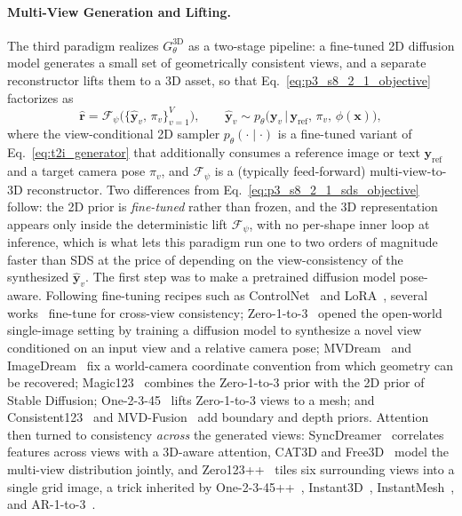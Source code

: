 \paragraph{Multi-View Generation and Lifting.}
\label{para:p3_s8_2_1_mv}
The third paradigm realizes $G_\theta^{\text{3D}}$ as a two-stage pipeline: a fine-tuned 2D diffusion model generates a small set of geometrically consistent views, and a separate reconstructor lifts them to a 3D asset, so that Eq.~\eqref{eq:p3_s8_2_1_objective} factorizes as
\begin{equation}
\hat{\mathbf{r}}
=
\mathcal{F}_\psi\Big(\big\{\hat{\mathbf{y}}_v,\,\pi_v\big\}_{v=1}^V\Big),
\qquad
\hat{\mathbf{y}}_v \sim p_\theta\big(\mathbf{y}_v \,\big|\, \mathbf{y}_{\text{ref}},\,\pi_v,\,\phi(\mathbf{x})\big),
\label{eq:p3_s8_2_1_mv_objective}
\end{equation}
where the view-conditional 2D sampler $p_\theta(\cdot\mid\cdot)$ is a fine-tuned variant of Eq.~\eqref{eq:t2i_generator} that additionally consumes a reference image or text $\mathbf{y}_{\text{ref}}$ and a target camera pose $\pi_v$, and $\mathcal{F}_\psi$ is a (typically feed-forward) multi-view-to-3D reconstructor.
Two differences from Eq.~\eqref{eq:p3_s8_2_1_sds_objective} follow: the 2D prior is \emph{fine-tuned} rather than frozen, and the 3D representation appears only inside the deterministic lift $\mathcal{F}_\psi$, with no per-shape inner loop at inference, which is what lets this paradigm run one to two orders of magnitude faster than SDS at the price of depending on the view-consistency of the synthesized $\hat{\mathbf{y}}_v$.
The first step was to make a pretrained diffusion model pose-aware. Following fine-tuning recipes such as ControlNet~\cite{zhang2023adding} and LoRA~\cite{hu2022lora}, several works~\cite{raj2023dreambooth3d, seo2023let3DFuse} fine-tune for cross-view consistency; Zero-1-to-3~\cite{liu2023zero} opened the open-world single-image setting by training a diffusion model to synthesize a novel view conditioned on an input view and a relative camera pose; MVDream~\cite{shi2023mvdream} and ImageDream~\cite{wang2023imagedream} fix a world-camera coordinate convention from which geometry can be recovered; Magic123~\cite{qian2023magic123} combines the Zero-1-to-3 prior with the 2D prior of Stable Diffusion; One-2-3-45~\cite{liu2023one2345} lifts Zero-1-to-3 views to a mesh; and Consistent123~\cite{lin2024consistent123} and MVD-Fusion~\cite{hu2024mvdfusion} add boundary and depth priors.
Attention then turned to consistency \emph{across} the generated views: SyncDreamer~\cite{liu2023syncdreamer} correlates features across views with a 3D-aware attention, CAT3D and Free3D~\cite{gao2024cat3d, zheng2024free3d} model the multi-view distribution jointly, and Zero123++~\cite{shi2023zero123++} tiles six surrounding views into a single grid image, a trick inherited by One-2-3-45++~\cite{liu2024one2345++}, Instant3D~\cite{li2023instant3d}, InstantMesh~\cite{xu2024instantmesh}, and AR-1-to-3~\cite{zhang2025ar123}.

